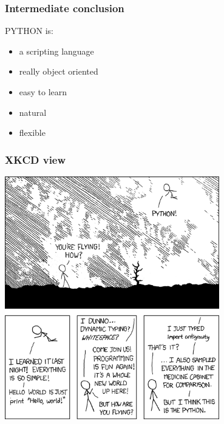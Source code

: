 \documentclass[14pt]{beamer}
\begin{document}
\begin{frame}
\frametitle{Intermediate conclusion}
PYTHON is:
\begin{itemize}
\item a scripting language
\item really object oriented
\item easy to learn
\item natural
\item flexible
\end{itemize}
\end{frame}

\begin{frame}
\frametitle{XKCD view}
\centering
\includegraphics[width=0.7\textwidth]{python.png}

\end{frame}
\end{document}
